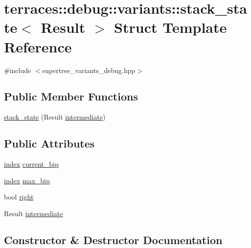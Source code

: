 \hypertarget{structterraces_1_1debug_1_1variants_1_1stack__state}{}\section{terraces\+:\+:debug\+:\+:variants\+:\+:stack\+\_\+state$<$ Result $>$ Struct Template Reference}
\label{structterraces_1_1debug_1_1variants_1_1stack__state}


{\ttfamily \#include $<$supertree\+\_\+variants\+\_\+debug.\+hpp$>$}

\subsection*{Public Member Functions}
\begin{DoxyCompactItemize}
\item 
\hyperlink{structterraces_1_1debug_1_1variants_1_1stack__state_aa6e7dd897252ad8b00833ba51f488ef1}{stack\+\_\+state} (Result \hyperlink{structterraces_1_1debug_1_1variants_1_1stack__state_a808ad42bf719be610fb8b85c426858a1}{intermediate})
\end{DoxyCompactItemize}
\subsection*{Public Attributes}
\begin{DoxyCompactItemize}
\item 
\hyperlink{namespaceterraces_adbc33ccb543d1634e96d0eb02e472c77}{index} \hyperlink{structterraces_1_1debug_1_1variants_1_1stack__state_a99c9586ee3fc9e182d85d5c9bec85175}{current\+\_\+bip}
\item 
\hyperlink{namespaceterraces_adbc33ccb543d1634e96d0eb02e472c77}{index} \hyperlink{structterraces_1_1debug_1_1variants_1_1stack__state_aed75425f1d76ae6bec3e9a733bf8de9d}{max\+\_\+bip}
\item 
bool \hyperlink{structterraces_1_1debug_1_1variants_1_1stack__state_a3b6c53beae52fe9d9afce640c6ea08e4}{right}
\item 
Result \hyperlink{structterraces_1_1debug_1_1variants_1_1stack__state_a808ad42bf719be610fb8b85c426858a1}{intermediate}
\end{DoxyCompactItemize}


\subsection{Constructor \& Destructor Documentation}
\mbox{\label{structterraces_1_1debug_1_1variants_1_1stack__state_aa6e7dd897252ad8b00833ba51f488ef1}} 
